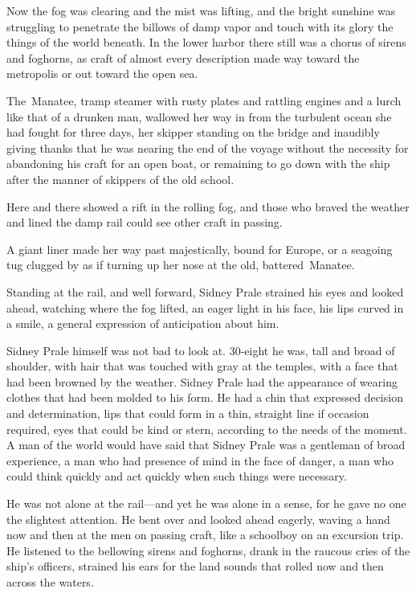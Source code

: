 \documentclass{novel}
\begin{document}
Now the fog was clearing and the mist was lifting, and the bright sunshine was struggling to penetrate the billows of damp vapor and touch with its glory the things of the world beneath. In the lower harbor there still was a chorus of sirens and foghorns, as craft of almost every description made way toward the metropolis or out toward the open sea.

The Manatee, tramp steamer with rusty plates and rattling engines and a lurch like that of a drunken man, wallowed her way in from the turbulent ocean she had fought for three days, her skipper standing on the bridge and inaudibly giving thanks that he was nearing the end of the voyage without the necessity for abandoning his craft for an open boat, or remaining to go down with the ship after the manner of skippers of the old school.

Here and there showed a rift in the rolling fog, and those who braved the weather and lined the damp rail could see other craft in passing.

A giant liner made her way past majestically, bound for Europe, or a seagoing tug clugged by as if turning up her nose at the old, battered Manatee.

Standing at the rail, and well forward, Sidney Prale strained his eyes and looked ahead, watching where the fog lifted, an eager light in his face, his lips curved in a smile, a general expression of anticipation about him.

Sidney Prale himself was not bad to look at. 30-eight he was, tall and broad of shoulder, with hair that was touched with gray at the temples, with a face that had been browned by the weather. Sidney Prale had the appearance of wearing clothes that had been molded to his form. He had a chin that expressed decision and determination, lips that could form in a thin, straight line if occasion required, eyes that could be kind or stern, according to the needs of the moment. A man of the world would have said that Sidney Prale was a gentleman of broad experience, a man who had presence of mind in the face of danger, a man who could think quickly and act quickly when such things were necessary.

He was not alone at the rail---and yet he was alone in a sense, for he gave no one the slightest attention. He bent over and looked ahead eagerly, waving a hand now and then at the men on passing craft, like a schoolboy on an excursion trip. He listened to the bellowing sirens and foghorns, drank in the raucous cries of the ship's officers, strained his ears for the land sounds that rolled now and then across the waters.
\end{document}
